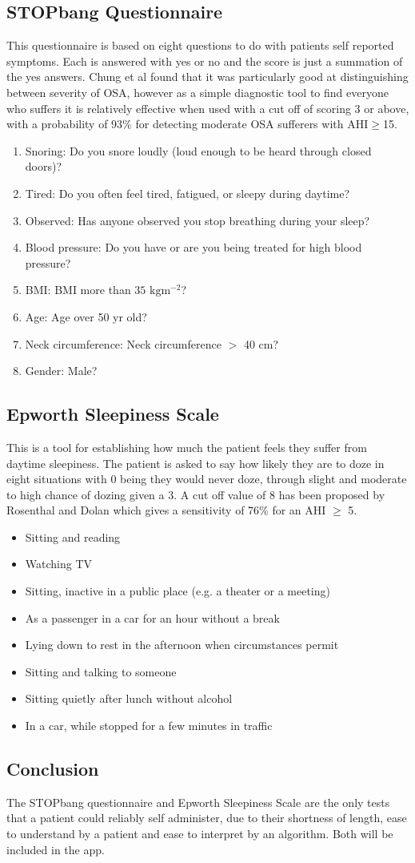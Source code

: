 \subsection{STOPbang Questionnaire}
This questionnaire is based on eight questions to do with patients self reported symptoms. Each is answered with yes or no and the score is just a summation of the yes answers. Chung et al found that it was particularly good at distinguishing between severity of OSA, however as a simple diagnostic tool to find everyone who suffers it is relatively effective when used with a cut off of scoring 3 or above, with a probability of 93\% for detecting moderate OSA sufferers with AHI$\geq$15.
\begin{enumerate}
\item Snoring: Do you snore loudly (loud enough to be heard through closed doors)?
\item Tired: Do you often feel tired, fatigued, or sleepy during daytime?
\item Observed: Has anyone observed you stop breathing during your sleep?
\item Blood pressure: Do you have or are you being treated for high blood pressure?
\item BMI: BMI more than $35 \text{ kg} \text{m}^{−2}$?
\item Age: Age over 50 yr old?
\item Neck circumference: Neck circumference $>$ 40 cm?
\item Gender: Male?
\end{enumerate}

\subsection{Epworth Sleepiness Scale}
This is a tool for establishing how much the patient feels they suffer from daytime sleepiness. The patient is asked to say how likely they are to doze in eight situations with 0 being they would never doze, through slight and moderate to high chance of dozing given a 3. A cut off value of 8 has been proposed by Rosenthal and Dolan which gives a sensitivity of 76\% for an AHI $\geq$ 5. 
\begin{itemize}
\item Sitting and reading
\item Watching TV
\item Sitting, inactive in a public place (e.g. a theater or a meeting)
\item As a passenger in a car for an hour without a break
\item Lying down to rest in the afternoon when circumstances permit
\item Sitting and talking to someone
\item Sitting quietly after lunch without alcohol
\item In a car, while stopped for a few minutes in traffic
\end{itemize}

\subsection{Conclusion}
The STOPbang questionnaire and Epworth Sleepiness Scale are the only tests that a patient could reliably self administer, due to their shortness of length, ease to understand by a patient and ease to interpret by an algorithm. Both will be included in the app.
